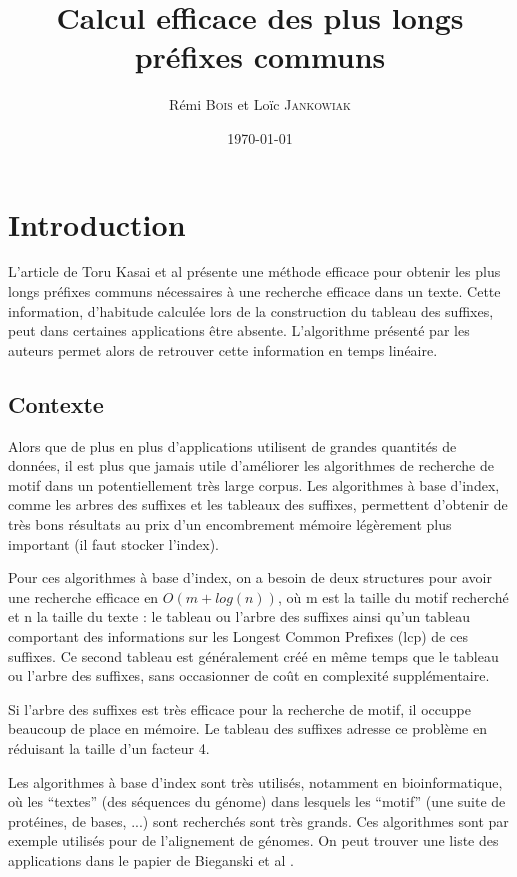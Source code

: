 \documentclass[a4paper,10pt]{article}
\title{Calcul efficace des plus longs préfixes communs}
\author{Rémi \textsc{Bois} et Loïc \textsc{Jankowiak}}
\date{\today}
\begin{document}
\maketitle


\section{Introduction}
\label{sec:intro}

L'article de Toru Kasai et al\cite{Kasai01} présente une méthode efficace pour
obtenir les plus longs préfixes communs nécessaires à une recherche
efficace dans un texte. Cette information, d'habitude calculée lors de
la construction du tableau des suffixes, peut dans certaines
applications être absente. L'algorithme présenté par les auteurs
permet alors de retrouver cette information en temps linéaire.


\subsection{Contexte}
\label{sec:context}

Alors que de plus en plus d'applications utilisent de grandes
quantités de données, il est plus que jamais utile d'améliorer les
algorithmes de recherche de motif dans un potentiellement très large
corpus. Les algorithmes à base d'index, comme les arbres des suffixes
et les tableaux des suffixes, permettent d'obtenir de très bons
résultats au prix d'un encombrement mémoire légèrement plus important
(il faut stocker l'index).

Pour ces algorithmes à base d'index, on a besoin de deux structures
pour avoir une recherche efficace en $O(m+ log(n))$, où m est la
taille du motif recherché et n la taille du texte : le tableau ou
l'arbre des suffixes ainsi qu'un tableau comportant des informations
sur les Longest Common Prefixes (lcp) de ces suffixes. Ce second
tableau est généralement créé en même temps que le tableau ou l'arbre des
suffixes, sans occasionner de coût en complexité supplémentaire.

Si l'arbre des suffixes est très efficace pour la recherche de motif,
il occuppe beaucoup de place en mémoire. Le tableau des suffixes
adresse ce problème en réduisant la taille d'un facteur 4.

Les algorithmes à base d'index sont très utilisés, notamment en
bioinformatique, où les ``textes'' (des séquences du génome) dans
lesquels les ``motif'' (une suite de protéines, de bases, ...) sont
recherchés sont très grands. Ces algorithmes sont par exemple utilisés
pour de l'alignement de génomes\cite{Kurtz04}. On peut trouver une
liste des applications dans le papier de Bieganski et al \cite{Bieganski94}.
\end{document}
